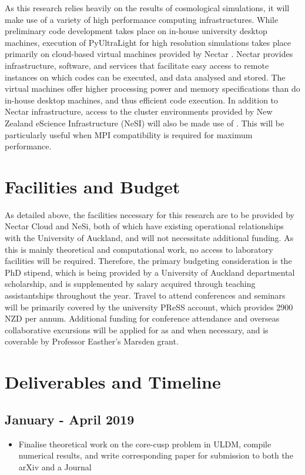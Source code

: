 As this research relies heavily on the results of cosmological simulations, it will make use of a variety of high performance computing infrastructures. While preliminary code development takes place on in-house university desktop machines, execution of PyUltraLight for high resolution simulations takes place primarily on cloud-based virtual machines provided by Nectar \cite{nectar}. Nectar provides infrastructure, software, and services that facilitate easy access to remote instances on which codes can be executed, and data analysed and stored. The virtual machines offer higher processing power and memory specifications than do in-house desktop machines, and thus efficient code execution. 
In addition to Nectar infrastructure, access to the cluster environments provided by New Zealand eScience Infrastructure (NeSI) will also be made use of \cite{nesi}. This will be particularly useful when MPI compatibility is required for maximum performance.


\section{Facilities and Budget}

As detailed above, the facilities necessary for this research are to be provided by Nectar Cloud and NeSi, both of which have existing operational relationships with the University of Auckland, and will not necessitate additional funding. As this is mainly theoretical and computational work, no access to laboratory facilities will be required. Therefore, the primary budgeting consideration is the PhD stipend, which is being provided by a University of Auckland departmental scholarship, and is supplemented by salary acquired through teaching assistantships throughout the year. Travel to attend conferences and seminars will be primarily covered by the university PReSS account, which provides 2900 NZD per annum. Additional funding for conference attendance and overseas collaborative excursions will be applied for as and when necessary, and is coverable by Professor Easther's Marsden grant.


\section{Deliverables and Timeline}

\subsection*{January - April 2019}
\begin{itemize}
    \item Finalise theoretical work on the core-cusp problem in ULDM, compile numerical results, and write corresponding paper for submission to both the arXiv and a Journal
\end{itemize}

